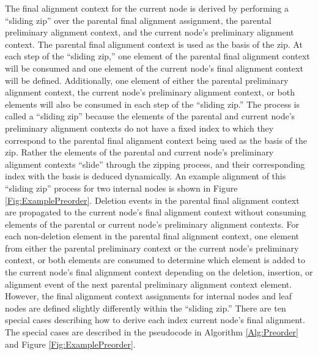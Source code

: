 \documentclass[11pt]{article}
\begin{document}
The final alignment context for the current node is derived by performing a ``sliding zip'' over the parental final alignment assignment, the parental preliminary alignment context, and the current node's preliminary alignment context.
The parental final alignment context is used as the basis of the zip.
At each step of the ``sliding zip,'' one element of the parental final alignment context will be consumed and one element of the current node's final alignment context will be defined.
Additionally, one element of either the parental preliminary alignment context, the current node's preliminary alignment context, or both elements will also be consumed in each step of the ``sliding zip.''
The process is called a ``sliding zip'' because the elements of the parental and current node's preliminary alignment contexts do not have a fixed index to which they correspond to the parental final alignment context being used as the basis of the zip.
Rather the elements of the parental and current node's preliminary alignment contexts ``slide'' through the zipping process, and their corresponding index with the basis is deduced dynamically.
An example alignment of this ``sliding zip'' process for two internal  nodes is shown in Figure \ref{Fig:ExamplePreorder}.
Deletion events in the parental final alignment context are propagated to the current node's final alignment context without consuming elements of the parental or current node's preliminary alignment contexts.
For each non-deletion element in the parental final alignment context, one element from either the parental preliminary context or the current node's preliminary context, or both elements are consumed to determine which element is added to the current node's final alignment context depending on the deletion, insertion, or alignment event of the next parental preliminary alignment context element.
However, the final alignment context assignments for internal nodes and leaf nodes are defined slightly differently within the ``sliding zip.''
There are ten special cases describing how to derive each index current node's final alignment. The special cases are described in the pseudocode in Algorithm \ref{Alg:Preorder} and Figure \ref{Fig:ExamplePreorder}.
\end{document}

